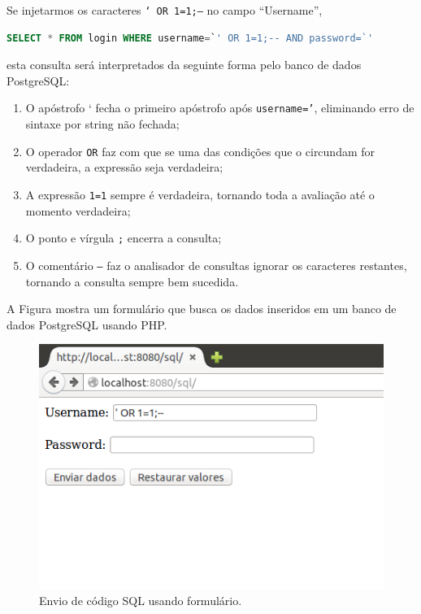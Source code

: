\begin{frame}[fragile]{}

Se injetarmos os caracteres {\tt ` OR 1=1;--} no campo ``Username'',

\begin{lstlisting}[language=SQL]
SELECT * FROM login WHERE username=`' OR 1=1;-- AND password=`'
\end{lstlisting}

esta consulta será interpretados da seguinte forma pelo banco de dados
PostgreSQL:

\begin{enumerate}
\item O apóstrofo ` fecha o primeiro apóstrofo após {\tt username='},
  eliminando erro de sintaxe por string não fechada;
\item O operador {\tt OR} faz com que se uma das condições que o
  circundam for verdadeira, a expressão seja verdadeira;\pause
\item A expressão {\tt 1=1} sempre é verdadeira, tornando toda a
  avaliação até o momento verdadeira;
\item O ponto e vírgula {\tt ;} encerra a consulta;\pause
\item O comentário {\tt --} faz o analisador de consultas ignorar os
  caracteres restantes, tornando a consulta sempre bem sucedida.
\end{enumerate}
\end{frame}

\begin{frame}{}\small
A Figura mostra um formulário que busca os dados inseridos 
em um banco de dados PostgreSQL usando PHP.

  \begin{figure}
    \centering
    \includegraphics[scale=.5]{img/sql-snd.png}
    \caption{Envio de código SQL usando formulário.}
  \end{figure}
\end{frame}

